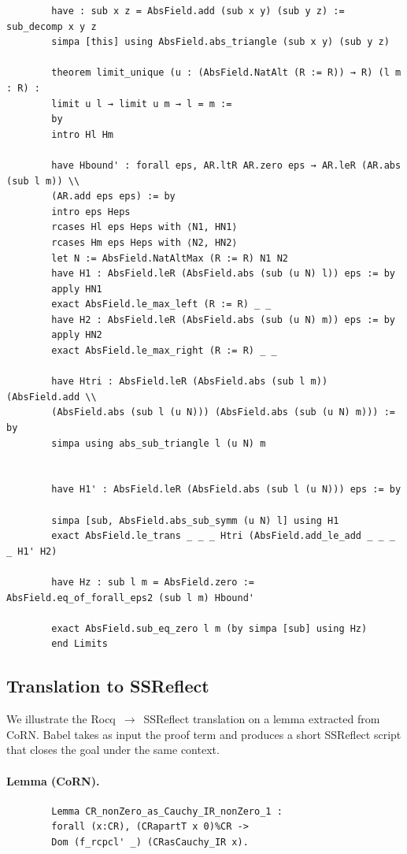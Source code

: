 \documentclass{article}
\theoremstyle{plain}
\theoremstyle{definition}
\theoremstyle{remark}
\begin{document}
\begin{verbatim}
		have : sub x z = AbsField.add (sub x y) (sub y z) := sub_decomp x y z
		simpa [this] using AbsField.abs_triangle (sub x y) (sub y z)
		
		theorem limit_unique (u : (AbsField.NatAlt (R := R)) → R) (l m : R) :
		limit u l → limit u m → l = m :=
		by
		intro Hl Hm
		
		have Hbound' : forall eps, AR.ltR AR.zero eps → AR.leR (AR.abs (sub l m)) \\
		(AR.add eps eps) := by
		intro eps Heps
		rcases Hl eps Heps with ⟨N1, HN1⟩
		rcases Hm eps Heps with ⟨N2, HN2⟩
		let N := AbsField.NatAltMax (R := R) N1 N2
		have H1 : AbsField.leR (AbsField.abs (sub (u N) l)) eps := by
		apply HN1
		exact AbsField.le_max_left (R := R) _ _
		have H2 : AbsField.leR (AbsField.abs (sub (u N) m)) eps := by
		apply HN2
		exact AbsField.le_max_right (R := R) _ _
		
		have Htri : AbsField.leR (AbsField.abs (sub l m)) (AbsField.add \\
		(AbsField.abs (sub l (u N))) (AbsField.abs (sub (u N) m))) := by
		simpa using abs_sub_triangle l (u N) m
		
		
		have H1' : AbsField.leR (AbsField.abs (sub l (u N))) eps := by
		
		simpa [sub, AbsField.abs_sub_symm (u N) l] using H1
		exact AbsField.le_trans _ _ _ Htri (AbsField.add_le_add _ _ _ _ H1' H2)
		
		have Hz : sub l m = AbsField.zero := AbsField.eq_of_forall_eps2 (sub l m) Hbound'
		
		exact AbsField.sub_eq_zero l m (by simpa [sub] using Hz)
		end Limits
	\end{verbatim}
	
	
	\subsection{Translation to SSReflect}
	\label{app:ssreflect}
	
	We illustrate the Rocq~$\to$~SSReflect translation on a lemma extracted from CoRN. Babel takes as input the proof term and produces a short SSReflect script that closes the goal under the same context.
	
	\paragraph{Lemma (CoRN).}
	\begin{verbatim}
		Lemma CR_nonZero_as_Cauchy_IR_nonZero_1 :
		forall (x:CR), (CRapartT x 0)%CR ->
		Dom (f_rcpcl' _) (CRasCauchy_IR x).
	\end{verbatim}
	
\end{document}
